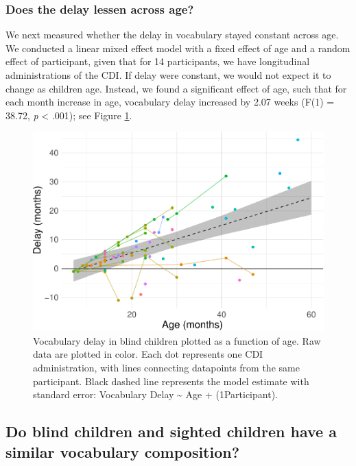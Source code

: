 \documentclass[
  man,floatsintext]{apa6}
\begin{document}
\hypertarget{does-the-delay-lessen-across-age}{%
\subsubsection{Does the delay lessen across age?}\label{does-the-delay-lessen-across-age}}

We next measured whether the delay in vocabulary stayed constant across age. We conducted a linear mixed effect model with a fixed effect of age and a random effect of participant, given that for 14 participants, we have longitudinal administrations of the CDI. If delay were constant, we would not expect it to change as children age. Instead, we found a significant effect of age, such that for each month increase in age, vocabulary delay increased by 2.07 weeks (F(1) = 38.72, \emph{p} \textless{} .001); see Figure \ref{fig:longitudinal-plot}.

\begin{figure}
\centering
\includegraphics{VI_CDI_manuscript_files/figure-latex/longitudinal-plot-1.pdf}
\caption{\label{fig:longitudinal-plot}Vocabulary delay in blind children plotted as a function of age. Raw data are plotted in color. Each dot represents one CDI administration, with lines connecting datapoints from the same participant. Black dashed line represents the model estimate with standard error: Vocabulary Delay \textasciitilde{} Age + (1\textbar Participant).}
\end{figure}

\hypertarget{do-blind-children-and-sighted-children-have-a-similar-vocabulary-composition}{%
\subsection{Do blind children and sighted children have a similar vocabulary composition?}\label{do-blind-children-and-sighted-children-have-a-similar-vocabulary-composition}}
\end{document}
